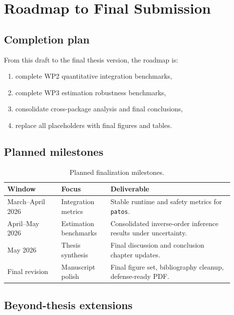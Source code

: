 \chapter{Roadmap to Final Submission}

\section{Completion plan}

From this draft to the final thesis version, the roadmap is:

\begin{enumerate}
    \item complete WP2 quantitative integration benchmarks,
    \item complete WP3 estimation robustness benchmarks,
    \item consolidate cross-package analysis and final conclusions,
    \item replace all placeholders with final figures and tables.
\end{enumerate}

\section{Planned milestones}

\begin{table}[tbp]
\centering
\caption{Planned finalization milestones.}
\label{tab:final_milestones}
\begin{tabular}{@{}p{0.22\linewidth}p{0.2\linewidth}p{0.5\linewidth}@{}}
\toprule
Window & Focus & Deliverable \\
\midrule
March--April 2026 & Integration metrics & Stable runtime and safety metrics for \texttt{patos}. \\
April--May 2026 & Estimation benchmarks & Consolidated inverse-order inference results under uncertainty. \\
May 2026 & Thesis synthesis & Final discussion and conclusion chapter updates. \\
Final revision & Manuscript polish & Final figure set, bibliography cleanup, defense-ready PDF. \\
\bottomrule
\end{tabular}
\end{table}

\section{Beyond-thesis extensions}

